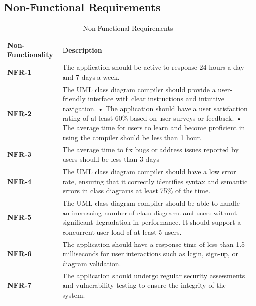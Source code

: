 \documentclass[12pt,a4paper]{article}
\begin{document}
\newpage
\subsection{Non-Functional Requirements}
\begin{table}[h!]
\caption{Non-Functional Requirements}
    \centering
    \begin{tabular}{|l|p{7cm}|}
    \hline
       \textbf{Non-Functionality}&\textbf{Description} \\ %
       \hline
       \textbf{NFR-1}&
The application should be active to response 24 hours a day and 7 days a week.\\ %
       \hline
       \textbf{NFR-2}&
       The UML class diagram compiler should provide a user-friendly interface with clear instructions and intuitive navigation.
\newline• The application should have a user satisfaction rating of at least 60\% based on user surveys or feedback.
\newline• The average time for users to learn and become proficient in using the compiler should be less than 1 hour.\\ %
       \hline
       \textbf{NFR-3}&
       The average time to fix bugs or address issues reported by users should be less than 3 days.\\ %
       \hline
       \textbf{NFR-4}&
        The UML class diagram compiler should have a low error rate, ensuring that it correctly identifies syntax and semantic errors in class diagrams at least 75\% of the time.\\ %
       \hline
       \textbf{NFR-5}&
        The UML class diagram compiler should be able to handle an increasing number of class diagrams and users without significant degradation in performance. It should support a concurrent user load of at least 5 users.\\ %
       \hline
       \textbf{NFR-6}&
       The application should have a response time of less than 1.5 milliseconds for user interactions such as login, sign-up, or diagram validation.\\ %
       \hline
       \textbf{NFR-7}&
       The application should undergo regular security assessments and vulnerability testing to ensure the integrity of the system.\\ %
       \hline
    \end{tabular} 
    \end{table}
    \clearpage
\end{document}
